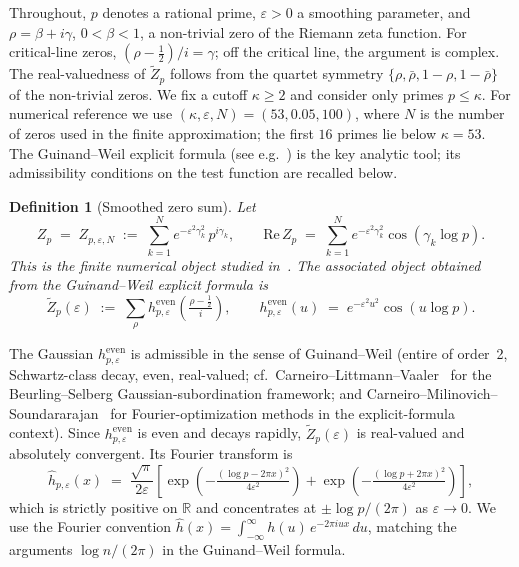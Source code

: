 \documentclass[11pt]{article}
\newtheorem{definition}[theorem]{Definition}
\begin{document}
Throughout, $p$ denotes a rational prime, $\varepsilon>0$ a smoothing
parameter, and $\rho=\beta+i\gamma$, $0<\beta<1$, a non-trivial zero
of the Riemann zeta function.
For critical-line zeros, $(\rho-\tfrac12)/i=\gamma$; off the critical
line, the argument is complex. The real-valuedness of $\widetilde Z_p$
follows from the quartet symmetry
$\{\rho,\bar\rho,1-\rho,1-\bar\rho\}$ of the non-trivial zeros.
We fix a cutoff $\kappa\ge 2$ and consider only primes $p\le\kappa$.
For numerical reference we use $(\kappa,\varepsilon,N)=(53,0.05,100)$,
where $N$ is the number of zeros used in the finite approximation;
the first $16$ primes lie below $\kappa=53$.
The Guinand--Weil explicit formula
(see e.g.\ \cite[\S\,5.5]{IwaniecKowalski04}) is the key analytic tool;
its admissibility conditions on the test function are recalled below.

\begin{definition}[Smoothed zero sum]
\label{def:smoothed}
Let
\[
Z_p \;=\; Z_{p,\varepsilon,N} \;:=\; \sum_{k=1}^{N} e^{-\varepsilon^2\gamma_k^2}\,
p^{i\gamma_k},
\qquad
\mathrm{Re}\,Z_p \;=\; \sum_{k=1}^{N} e^{-\varepsilon^2\gamma_k^2}
                        \cos(\gamma_k\log p).
\]
This is the finite numerical object studied in~\cite{Paper4,Paper5}.
The associated object obtained from the Guinand--Weil explicit formula is
\[
\widetilde Z_p(\varepsilon) \;:=\; \sum_{\rho} h^{\mathrm{even}}_{p,\varepsilon}
\!\left(\tfrac{\rho-\tfrac12}{i}\right),
\qquad
h^{\mathrm{even}}_{p,\varepsilon}(u) \;=\; e^{-\varepsilon^2 u^2}
                                            \cos(u\log p).
\]
\end{definition}

The Gaussian $h^{\mathrm{even}}_{p,\varepsilon}$ is admissible
in the sense of Guinand--Weil (entire of order~2, Schwartz-class
decay, even, real-valued; cf.\
Carneiro--Littmann--Vaaler~\cite{CarneiroLittmannVaaler13}
for the Beurling--Selberg Gaussian-subordination framework;
and Carneiro--Milinovich--Soundararajan~\cite{CarneiroMilinovichSoundararajan19}
for Fourier-optimization methods in the explicit-formula context).
Since $h^{\mathrm{even}}_{p,\varepsilon}$ is even and decays rapidly,
$\widetilde Z_p(\varepsilon)$ is real-valued and absolutely convergent.
Its Fourier transform is
\[
\widehat{h}_{p,\varepsilon}(x) \;=\; \frac{\sqrt{\pi}}{2\varepsilon}
\!\left[\exp\!\left(-\tfrac{(\log p-2\pi x)^2}{4\varepsilon^2}\right)
      +\exp\!\left(-\tfrac{(\log p+2\pi x)^2}{4\varepsilon^2}\right)
\right],
\]
which is strictly positive on $\mathbb R$ and concentrates at
$\pm\log p/(2\pi)$ as $\varepsilon\to 0$.
We use the Fourier convention
$\widehat{h}(x)=\int_{-\infty}^{\infty}h(u)\,e^{-2\pi iux}\,du$,
matching the arguments $\log n/(2\pi)$ in the Guinand--Weil formula.
\end{document}
